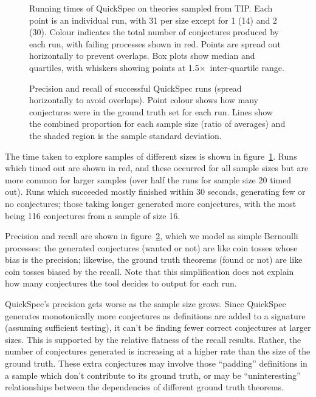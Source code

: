\begin{figure}
  \centering
  
  \caption{Running times of QuickSpec on theories sampled from TIP. Each point
    is an individual run, with 31 per size except for 1 (14) and 2 (30). Colour
    indicates the total number of conjectures produced by each run, with failing
    processes shown in red. Points are spread out horizontally to prevent
    overlaps. Box plots show median and quartiles, with whiskers showing points
    at 1.5$\times$~inter-quartile range.}
  \label{figure:quickspec_runtimes}
\end{figure}

\begin{figure}
  \centering
  
  \caption{Precision and recall of successful QuickSpec runs (spread
    horizontally to avoid overlaps). Point colour shows how many conjectures
    were in the ground truth set for each run. Lines show the combined
    proportion for each sample size (ratio of averages) and the shaded region is
    the sample standard deviation.}
  \label{figure:quickspec_precRec}
\end{figure}

The time taken to explore samples of different sizes is shown in
figure~\ref{figure:quickspec_runtimes}. Runs which timed out are shown in red,
and these occurred for all sample sizes but are more common for larger samples
(over half the runs for sample size 20 timed out). Runs which succeeded mostly
finished within 30 seconds, generating few or no conjectures; those taking
longer generated more conjectures, with the most being 116 conjectures from a
sample of size 16.

Precision and recall are shown in figure~\ref{figure:quickspec_precRec}, which
we model as simple Bernoulli processes: the generated conjectures (wanted or
not) are like coin tosses whose bias is the precision; likewise, the ground
truth theorems (found or not) are like coin tosses biased by the recall. Note
that this simplification does not explain how many conjectures the tool decides
to output for each run.

QuickSpec's precision gets worse as the sample size grows. Since QuickSpec
generates monotonically more conjectures as definitions are added to a signature
(assuming sufficient testing), it can't be finding fewer correct conjectures at
larger sizes. This is supported by the relative flatness of the recall results.
Rather, the number of conjectures generated is increasing at a higher rate than
the size of the ground truth. These extra conjectures may involve those
``padding'' definitions in a sample which don't contribute to its ground truth,
or may be ``uninteresting'' relationships between the dependencies of different
ground truth theorems.

